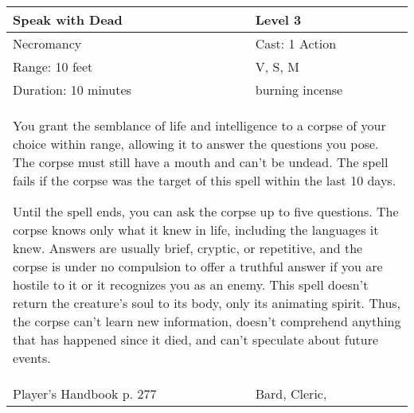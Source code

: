\documentclass[11pt]{report}
\begin{document}
\begin{table}[H]
	\begin{tabular}{||p{6cm}|p{6cm}||}
		\hline\hline
		\bf{Speak with Dead} & Level 3\\ \hline
		Necromancy & Cast: 1 Action\\ \hline
		Range: 10 feet & V, S, M\\ \hline
		Duration: 10 minutes & burning incense\\ \hline
		\multicolumn{2}{||p{12cm}||}{You grant the semblance of life and intelligence to a corpse of your choice within range, allowing it to answer the questions you pose. The corpse must still have a mouth and can’t be undead. The spell fails if the corpse was the target of this spell within the last 10 days.

Until the spell ends, you can ask the corpse up to five questions. The corpse knows only what it knew in life, including the languages it knew. Answers are usually brief, cryptic, or repetitive, and the corpse is under no compulsion to offer a truthful answer if you are hostile to it or it recognizes you as an enemy. This spell doesn’t return the creature’s soul to its body, only its animating spirit. Thus, the corpse can’t learn new information, doesn’t comprehend anything that has happened since it died, and can’t speculate about future events.}\\ \hline
Player's Handbook p. 277 & Bard, Cleric, \\ \hline\hline
	\end{tabular}
\end{table}
\end{document}
